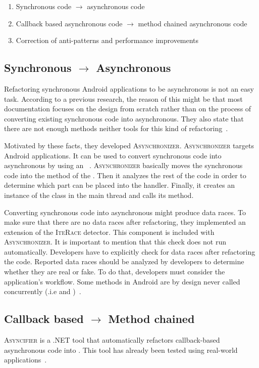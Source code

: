 \documentclass[type=bsc,accentcolor=tud9c]{tudthesis}
\newcommand{\framework}[1]{\textcolor{black!65}{#1}}
\begin{document}
\begin{enumerate}
	\item Synchronous code $\rightarrow$ asynchronous code
	\item Callback based asynchronous code $\rightarrow$ method chained asynchronous code
	\item Correction of anti-patterns and performance improvements
\end{enumerate}

\subsection{Synchronous $\rightarrow$ Asynchronous}
Refactoring synchronous \framework{Android} applications to be asynchronous is not an easy task. According to a previous research, the reason of this might be that most documentation focuses on the design from scratch rather than on the process of converting existing synchronous code into asynchronous. They also state that there are not enough methods neither tools for this kind of refactoring~\cite{paperAsyncMobile}.

Motivated by these facts, they developed \textsc{Asynchronizer}. \textsc{Asynchronizer} targets \framework{Android} applications. It can be used to convert synchronous code into asynchronous by using an ~\cite{paperRetrofittingConcurrency}. \textsc{Asynchronizer} basically moves the synchronous code into the  method of the . Then it analyzes the rest of the code in order to determine which part can be placed into the  handler. Finally, it creates an instance of the class in the main thread and calls its  method.

Converting synchronous code into asynchronous might produce data races. To make sure that there are no data races after refactoring, they implemented an extension of the \textsc{IteRace} detector. This component is included with \textsc{Asynchronizer}. It is important to mention that this check does not run automatically. Developers have to explicitly check for data races after refactoring the code. Reported data races should be analyzed by developers to determine whether they are real or fake. To do that, developers must consider the application's workflow. Some methods in \framework{Android} are by design never called concurrently (.i.e  and )~\cite{paperRetrofittingConcurrency}.

\subsection{Callback based $\rightarrow$ Method chained}
\textsc{Asyncifier} is a \framework{.NET} tool that automatically refactors callback-based asynchronous code into . This tool has already been tested using real-world applications~\cite{paperAsyncMobile}.
\end{document}
